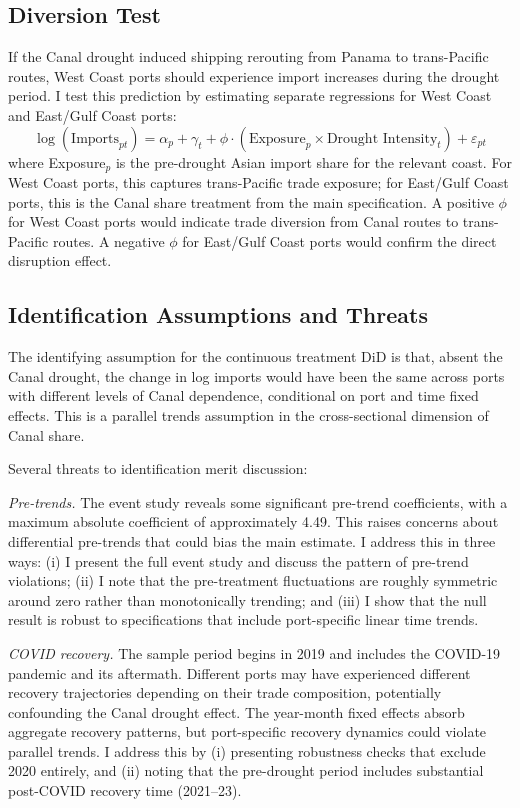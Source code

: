 \documentclass[12pt]{article}
\begin{document}
\subsection{Diversion Test}

If the Canal drought induced shipping rerouting from Panama to trans-Pacific routes, West Coast ports should experience import increases during the drought period. I test this prediction by estimating separate regressions for West Coast and East/Gulf Coast ports:
\begin{equation}
    \log(\text{Imports}_{pt}) = \alpha_p + \gamma_t + \phi \cdot (\text{Exposure}_p \times \text{Drought Intensity}_t) + \varepsilon_{pt}
\label{eq:diversion}
\end{equation}
where Exposure$_p$ is the pre-drought Asian import share for the relevant coast. For West Coast ports, this captures trans-Pacific trade exposure; for East/Gulf Coast ports, this is the Canal share treatment from the main specification. A positive $\phi$ for West Coast ports would indicate trade diversion from Canal routes to trans-Pacific routes. A negative $\phi$ for East/Gulf Coast ports would confirm the direct disruption effect.

\subsection{Identification Assumptions and Threats}

The identifying assumption for the continuous treatment DiD is that, absent the Canal drought, the change in log imports would have been the same across ports with different levels of Canal dependence, conditional on port and time fixed effects. This is a parallel trends assumption in the cross-sectional dimension of Canal share.

Several threats to identification merit discussion:

\textit{Pre-trends.} The event study reveals some significant pre-trend coefficients, with a maximum absolute coefficient of approximately 4.49. This raises concerns about differential pre-trends that could bias the main estimate. I address this in three ways: (i) I present the full event study and discuss the pattern of pre-trend violations; (ii) I note that the pre-treatment fluctuations are roughly symmetric around zero rather than monotonically trending; and (iii) I show that the null result is robust to specifications that include port-specific linear time trends.

\textit{COVID recovery.} The sample period begins in 2019 and includes the COVID-19 pandemic and its aftermath. Different ports may have experienced different recovery trajectories depending on their trade composition, potentially confounding the Canal drought effect. The year-month fixed effects absorb aggregate recovery patterns, but port-specific recovery dynamics could violate parallel trends. I address this by (i) presenting robustness checks that exclude 2020 entirely, and (ii) noting that the pre-drought period includes substantial post-COVID recovery time (2021--23).
\end{document}
